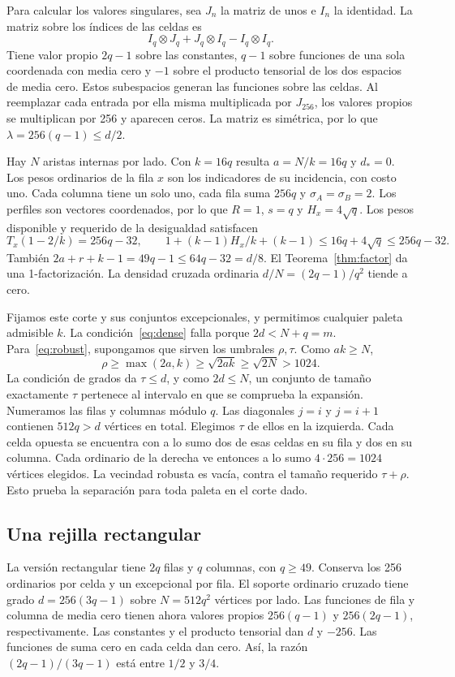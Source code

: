 \documentclass[11pt]{article}
\begin{document}
Para calcular los valores singulares, sea \(J_n\) la matriz de unos e \(I_n\) la identidad. La matriz sobre los índices de las celdas es
\[
 I_q\otimes J_q+J_q\otimes I_q-I_q\otimes I_q .
\]
Tiene valor propio \(2q-1\) sobre las constantes, \(q-1\) sobre funciones de una sola coordenada con media cero y \(-1\) sobre el producto tensorial de los dos espacios de media cero. Estos subespacios generan las funciones sobre las celdas. Al reemplazar cada entrada por ella misma multiplicada por \(J_{256}\), los valores propios se multiplican por 256 y aparecen ceros. La matriz es simétrica, por lo que \(\lambda=256(q-1)\le d/2\).

Hay \(N\) aristas internas por lado. Con \(k=16q\) resulta \(a=N/k=16q\) y \(d_*=0\). Los pesos ordinarios de la fila \(x\) son los indicadores de su incidencia, con costo uno. Cada columna tiene un solo uno, cada fila suma \(256q\) y \(\sigma_A=\sigma_B=2\). Los perfiles son vectores coordenados, por lo que \(R=1\), \(s=q\) y \(H_x=4\sqrt q\). Los pesos disponible y requerido de la desigualdad satisfacen
\[
 T_x(1-2/k)=256q-32,\qquad
 1+(k-1)H_x/k+(k-1)\le16q+4\sqrt q\le256q-32 .
\]
También \(2a+r+k-1=49q-1\le64q-32=d/8\). El Teorema~\ref{thm:factor} da una 1-factorización. La densidad cruzada ordinaria \(d/N=(2q-1)/q^2\) tiende a cero.

Fijamos este corte y sus conjuntos excepcionales, y permitimos cualquier paleta admisible \(k\). La condición~\eqref{eq:dense} falla porque \(2d<N+q=m\). Para~\eqref{eq:robust}, supongamos que sirven los umbrales \(\rho,\tau\). Como \(ak\ge N\),
\[
 \rho\ge\max(2a,k)\ge\sqrt{2ak}\ge\sqrt{2N}>1024 .
\]
La condición de grados da \(\tau\le d\), y como \(2d\le N\), un conjunto de tamaño exactamente \(\tau\) pertenece al intervalo en que se comprueba la expansión. Numeramos las filas y columnas módulo \(q\). Las diagonales \(j=i\) y \(j=i+1\) contienen \(512q>d\) vértices en total. Elegimos \(\tau\) de ellos en la izquierda. Cada celda opuesta se encuentra con a lo sumo dos de esas celdas en su fila y dos en su columna. Cada ordinario de la derecha ve entonces a lo sumo \(4\cdot256=1024\) vértices elegidos. La vecindad robusta es vacía, contra el tamaño requerido \(\tau+\rho\). Esto prueba la separación para toda paleta en el corte dado.

\subsection{Una rejilla rectangular}

La versión rectangular tiene \(2q\) filas y \(q\) columnas, con \(q\ge49\). Conserva los 256 ordinarios por celda y un excepcional por fila. El soporte ordinario cruzado tiene grado \(d=256(3q-1)\) sobre \(N=512q^2\) vértices por lado. Las funciones de fila y columna de media cero tienen ahora valores propios \(256(q-1)\) y \(256(2q-1)\), respectivamente. Las constantes y el producto tensorial dan \(d\) y \(-256\). Las funciones de suma cero en cada celda dan cero. Así, la razón \((2q-1)/(3q-1)\) está entre \(1/2\) y \(3/4\).
\end{document}
